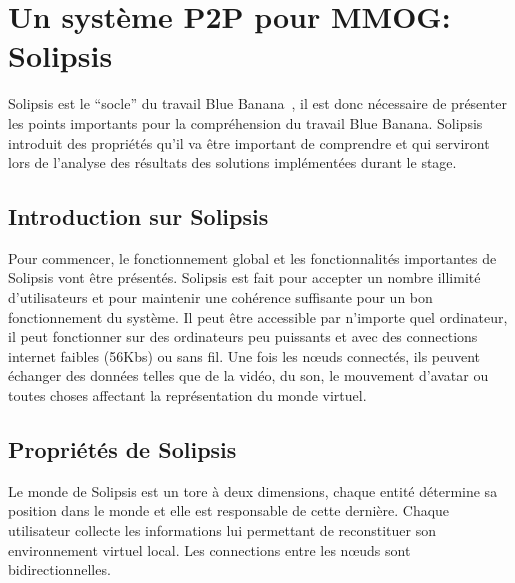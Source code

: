 \section{Un système P2P pour MMOG: Solipsis}
	\label{solipsis}
	Solipsis est le ``socle'' du travail Blue Banana~\cite{keller-solipsis}, il est donc nécessaire de présenter les points importants pour la compréhension du travail Blue Banana. Solipsis introduit des propriétés qu'il va être important de comprendre et qui serviront lors de l'analyse des résultats des solutions implémentées durant le stage.
	\subsection{Introduction sur Solipsis} 
	\par Pour commencer, le fonctionnement global et les fonctionnalités importantes de Solipsis vont être présentés. Solipsis est fait pour accepter un nombre illimité d'utilisateurs et pour maintenir une cohérence suffisante pour un bon fonctionnement du système. Il peut être accessible par n'importe quel ordinateur, il peut fonctionner sur des ordinateurs peu puissants et avec des connections internet faibles (56Kbs) ou sans fil. Une fois les nœuds connectés, ils peuvent échanger des données telles que de la vidéo, du son, le mouvement d'avatar ou toutes choses affectant la représentation du monde virtuel. \\
	\subsection{Propriétés de Solipsis}
	Le monde de Solipsis est un tore à deux dimensions, chaque entité détermine sa position dans le monde et elle est responsable de cette dernière. Chaque utilisateur collecte les informations lui permettant de reconstituer son environnement virtuel local. Les connections entre les nœuds sont bidirectionnelles. 
